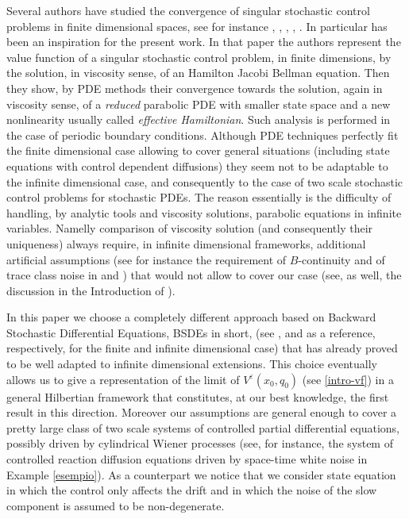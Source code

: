 \documentclass[reqno,a4paper,11 pt]{article}
\def \e {\varepsilon}
\numberwithin{equation}{section}
\begin{document}
\medskip 

Several authors have studied the  convergence of singular stochastic control problems in finite dimensional spaces, see for instance \cite{AlvBar},  \cite{Bensoussan}, \cite{KabPer}, \cite{KabRungg}, \cite{Kus}. In particular \cite{AlvBar} has been an inspiration for the present work. In that paper the authors represent the value function of a singular stochastic control problem, in finite dimensions, by the solution, in viscosity sense, of an Hamilton Jacobi Bellman equation.  Then they show, by PDE methods  their convergence towards the solution, again in viscosity sense, of a \textit{reduced} parabolic PDE with smaller state space and a new nonlinearity usually called \textit{effective Hamiltonian}. Such analysis is performed in the case of periodic boundary conditions. Although  PDE techniques  perfectly fit the finite dimensional case allowing to cover 
general situations (including state equations with control dependent diffusions) they seem not to be adaptable to the infinite dimensional case, and consequently to the case of two scale stochastic control problems for stochastic PDEs. The reason essentially is the difficulty of handling, by  analytic tools and viscosity solutions, parabolic equations in infinite variables. Namelly comparison of viscosity solution (and consequently their uniqueness) always require, in  infinite dimensional frameworks,  additional artificial assumptions (see for instance the requirement of $B$-continuity and of trace class noise in \cite{FGS} and \cite{Swi}) that would not allow to cover our  case (see, as well, the discussion in the Introduction of \cite{FuTes}).  


\medskip 

 
In this paper  we choose a completely different approach based on Backward Stochastic Differential Equations, BSDEs in short, (see  \cite {ParPeng}, and  \cite{FuTes} as a reference, respectively, for the finite and infinite  dimensional case) that has already proved to be well adapted to infinite dimensional extensions. This choice eventually allows us to give a representation of  the limit of $V^{\e}(x_0,q_0)$ (see \eqref{intro-vf}) in a general Hilbertian framework that constitutes, at our best knowledge, the first result in this direction. Moreover our assumptions are general enough to cover a pretty  large class of two scale systems of controlled partial differential equations, possibly driven by cylindrical Wiener processes (see,  for instance, the system of controlled reaction diffusion equations driven by space-time white noise in Example \ref{esempio}). 
As a counterpart we notice that we consider state equation in which the control only affects the drift and in which the noise of the slow component is assumed to be non-degenerate. 
\end{document}
